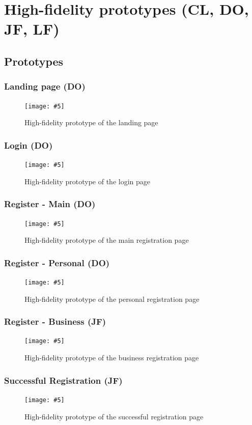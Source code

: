 \documentclass[a4paper,12pt]{article}
\newcommand{\includescalefigure}[5]{
\begin{figure}[H]
\centering
\texttt{[image: \#5]}
\captionsetup{width=.8\linewidth} 
\caption[#2]{#3}
\label{#1}
\end{figure}
}
\begin{document}
\section{High-fidelity prototypes (CL, DO, JF, LF)}
\subsection{Prototypes}
\subsubsection{Landing page (DO)}
\includescalefigure{fig:hf_landing}{Landing Page High-fidelity Prototype}{High-fidelity prototype of the landing page}{0.5}{"figma/Landing PageHF.PNG"}
\subsubsection{Login (DO)}
\includescalefigure{fig:hf_login}{Login High-fidelity Prototype}{High-fidelity prototype of the login page}{0.5}{"figma/Login PageHF.PNG"}
\subsubsection{Register - Main (DO)}
\includescalefigure{fig:hf_reg_main}{Main Registration High-fidelity Prototype}{High-fidelity prototype of the main registration page}{0.5}{"figma/Register PageHF.PNG"}
\subsubsection{Register - Personal (DO)}
\includescalefigure{fig:hf_reg_pers}{Personal Registration High-fidelity Prototype}{High-fidelity prototype of the personal registration page}{0.5}{"figma/Register Page PersonalHF.PNG"}

\subsubsection{Register - Business (JF)}
\includescalefigure{fig:hf_reg_busi}{Business Registration High-fidelity Prototype}{High-fidelity prototype of the business registration page}{0.25}{"figma/Register Page BusinessHF.PNG"}

\subsubsection{Successful Registration (JF)}
\includescalefigure{fig:hf_reg_succ}{Successful Registration High-fidelity Prototype}{High-fidelity prototype of the successful registration page}{0.5}{"figma/Successful Registration PageHF.PNG"}
\end{document}
